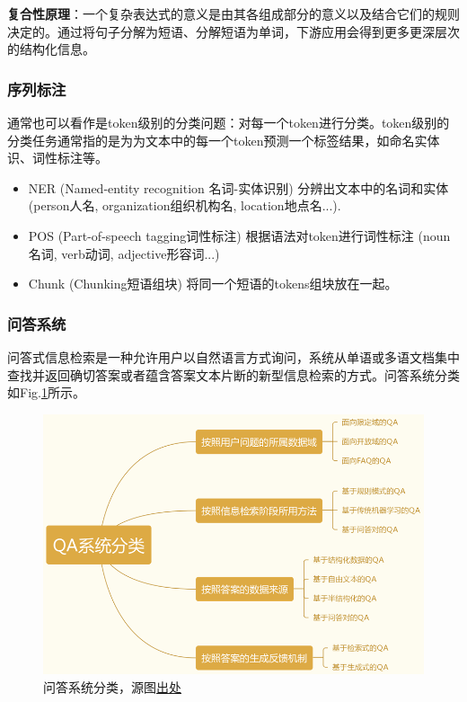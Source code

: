 \textbf{复合性原理}：一个复杂表达式的意义是由其各组成部分的意义以及结合它们的规则决定的。通过将句子分解为短语、分解短语为单词，下游应用会得到更多更深层次的结构化信息。

\subsubsection{序列标注}
通常也可以看作是token级别的分类问题：对每一个token进行分类。token级别的分类任务通常指的是为为文本中的每一个token预测一个标签结果，如命名实体识、词性标注等。
\begin{itemize}
	\item NER (Named-entity recognition 名词-实体识别) 分辨出文本中的名词和实体 (person人名, organization组织机构名, location地点名...).
	\item POS (Part-of-speech tagging词性标注) 根据语法对token进行词性标注 (noun名词, verb动词, adjective形容词...)
	\item Chunk (Chunking短语组块) 将同一个短语的tokens组块放在一起。
\end{itemize}

\subsubsection{问答系统}
问答式信息检索是一种允许用户以自然语言方式询问，系统从单语或多语文档集中查找并返回确切答案或者蕴含答案文本片断的新型信息检索的方式。问答系统分类如Fig.\ref{fig:qa}所示。
\begin{figure}[h]
	\centering
	\includegraphics[width=.7\textwidth]{pics/qa.png}
	\caption{问答系统分类，源图\href{https://blog.csdn.net/sinat_33231573/article/details/83473741}{出处}}
	\label{fig:qa}
\end{figure}









